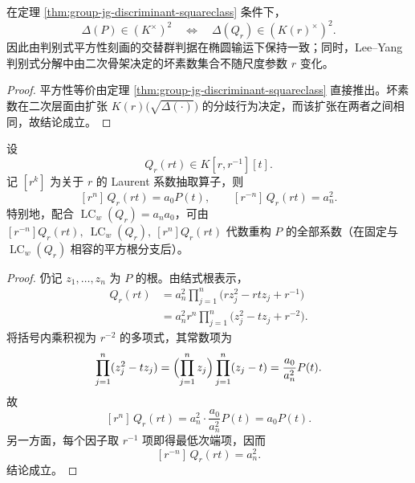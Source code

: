 \begin{corollary}\label{cor:group-jg-alt-criterion-stability}
在定理 \ref{thm:group-jg-discriminant-squareclass} 条件下，
\[
\Delta(P)\in (K^\times)^2
\quad\Longleftrightarrow\quad
\Delta(Q_r)\in (K(r)^\times)^2.
\]
因此由判别式平方性刻画的交替群判据在椭圆输运下保持一致；同时，Lee--Yang 判别式分解中由二次骨架决定的坏素数集合不随尺度参数 \(r\) 变化。
\end{corollary}
\begin{proof}
平方性等价由定理 \ref{thm:group-jg-discriminant-squareclass} 直接推出。坏素数在二次层面由扩张
\(
K(r)\bigl(\sqrt{\Delta(\cdot)}\bigr)
\)
的分歧行为决定，而该扩张在两者之间相同，故结论成立。
\end{proof}

\begin{theorem}[全息系数抽取与原多项式反演]\label{thm:group-jg-holographic-coefficient-recovery}
设
\[
Q_r(r t)\in K[r,r^{-1}][t].
\]
记 \([r^k]\) 为关于 \(r\) 的 Laurent 系数抽取算子，则
\[
[r^n]\,Q_r(r t)=a_0 P(t),\qquad
[r^{-n}]\,Q_r(r t)=a_n^2.
\]
特别地，配合 \(\operatorname{LC}_w(Q_r)=a_n a_0\)，可由
\(
[r^{-n}]Q_r(r t),\ \operatorname{LC}_w(Q_r),\ [r^n]Q_r(r t)
\)
代数重构 \(P\) 的全部系数（在固定与 \(\operatorname{LC}_w(Q_r)\) 相容的平方根分支后）。
\end{theorem}
\begin{proof}
仍记 \(z_1,\dots,z_n\) 为 \(P\) 的根。由结式根表示，
\[
\begin{aligned}
Q_r(r t)
&=a_n^2\prod_{j=1}^{n}\bigl(r z_j^2-r t z_j+r^{-1}\bigr)\\
&=a_n^2 r^n\prod_{j=1}^{n}\bigl(z_j^2-t z_j+r^{-2}\bigr).
\end{aligned}
\]
将括号内乘积视为 \(r^{-2}\) 的多项式，其常数项为
\[
\prod_{j=1}^{n}(z_j^2-t z_j)
=\Bigl(\prod_{j=1}^{n}z_j\Bigr)\prod_{j=1}^{n}(z_j-t)
=\frac{a_0}{a_n^2}P(t).
\]
故
\[
[r^n]\,Q_r(r t)=a_n^2\cdot \frac{a_0}{a_n^2}P(t)=a_0 P(t).
\]
另一方面，每个因子取 \(r^{-1}\) 项即得最低次端项，因而
\[
[r^{-n}]\,Q_r(r t)=a_n^2.
\]
结论成立。
\end{proof}

